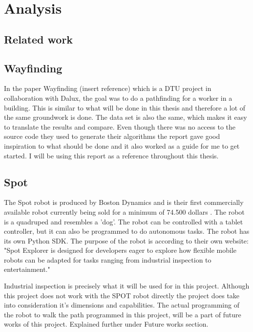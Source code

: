 \section{Analysis}
\subsection{Related work}




\subsection{Wayfinding}
In the paper Wayfinding (insert reference) which is a DTU project in collaboration with Dalux, the goal was to do a pathfinding for a worker in a building. This is similar to what will be done in this thesis and therefore a lot of the same groundwork is done. The data set is also the same, which makes it easy to translate the results and compare. Even though there was no access to the source code they used to generate their algorithms the report gave good inspiration to what should be done and it also worked as a guide for me to get started. I will be using this report as a reference throughout this thesis.


\subsection{Spot}
The Spot robot is produced by Boston Dynamics and is their first commercially available robot currently being sold for a minimum of 74.500 dollars \cite{spot}. The robot is a quadruped and resembles a 'dog'. The robot can be controlled with a tablet controller, but it can also be programmed to do autonomous tasks. The robot has its own Python SDK. The purpose of the robot is according to their own website: "Spot Explorer is designed for developers eager to explore how flexible mobile robots can be adapted for tasks ranging from industrial inspection to entertainment."\cite{spot}

Industrial inspection is precisely what it will be used for in this project. Although this project does not work with the SPOT robot directly the project does take into consideration it's dimensions and capabilities. 
The actual programming of the robot to walk the path programmed in this project, will be a part of future works of this project. Explained further under Future works section.

